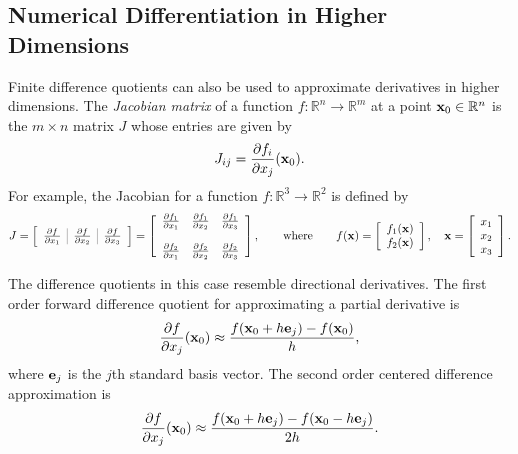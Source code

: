 \subsection*{Numerical Differentiation in Higher Dimensions} %

Finite difference quotients can also be used to approximate derivatives in higher dimensions.
The \emph{Jacobian matrix} of a function $f:\mathbb{R}^n \rightarrow \mathbb{R}^m$ at a point $\mathbf{x}_0 \in \mathbb{R}^n$ is the $m \times n$ matrix $J$ whose entries are given by
\begin{equation*}
J_{ij} = \frac{\partial f_i}{\partial x_j}(\mathbf{x}_0).
\end{equation*}
For example, the Jacobian for a function $f:\mathbb{R}^3 \rightarrow \mathbb{R}^2$ is defined by
\[
J = \left[\begin{array}{c|c|c}
\arrayrulecolor{gray}
\frac{\partial f}{\partial x_1}&\frac{\partial f}{\partial x_2}&\frac{\partial f}{\partial x_3}
\end{array}\right]
=
\left[\begin{array}{ccc}
\frac{\partial f_1}{\partial x_1}&\frac{\partial f_1}{\partial x_2}&\frac{\partial f_1}{\partial x_3}
\\ \\
\frac{\partial f_2}{\partial x_1}&\frac{\partial f_2}{\partial x_2}&\frac{\partial f_2}{\partial x_3}
\end{array}\right],
\qquad
\text{where}
\qquad
f(\x) =
\left[\begin{array}{c}
f_1(\x) \\ f_2(\x)
\end{array}\right],
\quad
\x = \left[\begin{array}{c}
x_1 \\ x_2 \\ x_3
\end{array}\right].
\]

The difference quotients in this case resemble directional derivatives.
The first order forward difference quotient for approximating a partial derivative is
\[
\frac{\partial f}{\partial x_j}(\mathbf{x}_0) \approx \frac{f(\mathbf{x}_0 + h\mathbf{e}_j) - f(\mathbf{x}_0)}{h},
\]
where $\mathbf{e}_j$ is the $j$th standard basis vector.
The second order centered difference approximation is
\begin{equation}
\frac{\partial f}{\partial x_j}(\mathbf{x}_0) \approx \frac{f(\mathbf{x}_0 + h\mathbf{e}_j) - f(\mathbf{x}_0 - h\mathbf{e}_j)}{2h}.
\label{eq:centered-quotient-high-dimension}
\end{equation}

